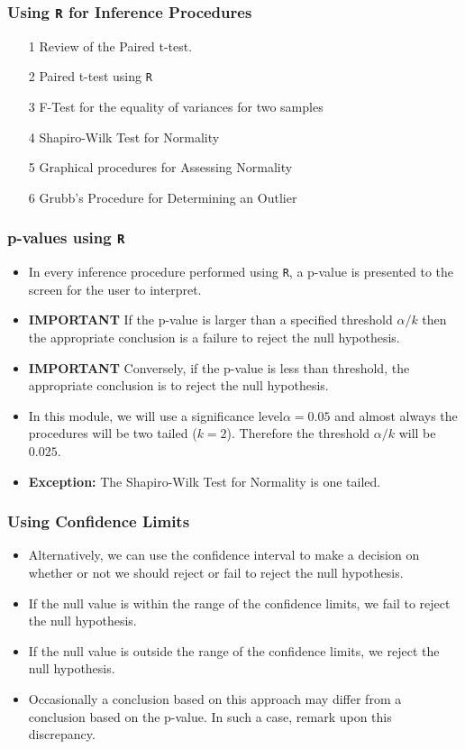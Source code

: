 
\begin{frame}
\frametitle{Using \texttt{R} for Inference Procedures}
\begin{itemize}
\item[1] Review of the Paired t-test.
\item[2] Paired t-test using \texttt{R}
\item[3] F-Test for the equality of variances for two samples
\item[4] Shapiro-Wilk Test for Normality
\item[5] Graphical procedures for Assessing Normality
\item[6] Grubb's Procedure for Determining an Outlier
\end{itemize}
\end{frame}
\begin{frame}
\frametitle{p-values using \texttt{R}}
\begin{itemize}
\item In every inference procedure performed using \texttt{R}, a p-value is presented to the screen for the user to interpret.

\item \textbf{IMPORTANT} If the p-value is larger than a specified threshold $\alpha/k$ then the appropriate conclusion is a
failure to reject the null hypothesis.

\item \textbf{IMPORTANT} Conversely, if the p-value is less than threshold, the appropriate conclusion is to reject the null hypothesis.

\item In this module, we will use a significance level$\alpha=0.05$ and almost always the procedures will be two tailed ($k=2$). Therefore the threshold $\alpha/k$ will be $0.025$.
\item \textbf{Exception:} The Shapiro-Wilk Test for Normality is one tailed.
\end{itemize}
\end{frame}

\begin{frame}
\frametitle{Using Confidence Limits}
\begin{itemize}
\item Alternatively, we can use the confidence interval to make a decision on whether or not we should reject or fail to reject the null hypothesis.
\item If the null value is within the range of the confidence limits, we fail to reject the null hypothesis.
\item If the null value is outside the range of the confidence limits, we reject the null hypothesis.
\item Occasionally a conclusion based on this approach may differ from a conclusion based on the p-value. In such a case, remark upon this discrepancy.
\end{itemize}
\end{frame}


